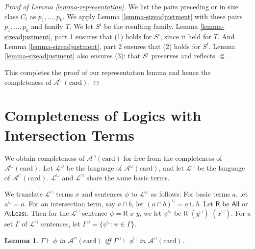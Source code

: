 \documentclass[letterpaper]{article} %
\newtheorem{lemma}[theorem]{Lemma}
\theoremstyle{definition}
\newcommand{\set}[1]{\{ #1 \}}
\newcommand{\proves}{\vdash}
\newcommand{\lang}{\mathcal{L}}
\newcommand{\Aunion}{\mathscr{A}^{\cup}}
\newcommand{\Ainter}{\mathscr{A}^{\cap}}
\newcommand{\R}[2]{\mathsf{R}\,\,#1\,\,#2}
\newcommand{\AllNoArgs}{\mathsf{All}}
\newcommand{\AtleastNoArgs}{\mathsf{AtLeast}}
\newcommand{\card}{\mathrm{card}}
\newcommand{\precsubseteq}{\Subset}
\begin{document}
\begin{proof}[Proof of Lemma \ref{lemma-representation}]
We list the pairs preceding or in size class $C_i$ as $p_1, \ldots, p_k$.  We apply Lemma \ref{lemma-sizeadjustment} with these pairs $p_1, \ldots, p_k$ and family $T$.  We let $S^i$ be the resulting family.  Lemma \ref{lemma-sizeadjustment}, part 1 ensures that (1) holds for $S^i$, since it held for $T$.  And Lemma \ref{lemma-sizeadjustment}, part 2 ensures that (2) holds for $S^i$.  Lemma \ref{lemma-sizeadjustment} also ensures (3): that $S^i$ preserves and reflects $\precsubseteq$.

This completes the proof of our representation lemma and hence the completeness of $\Aunion(\card)$.
\end{proof}



\section{Completeness of Logics with \\Intersection Terms}\label{s:completenes_intersections}

We obtain completeness of $\Ainter(\card)$ for free from the completeness of  $\Aunion(\card)$.
Let $\lang^\cup$ be the language 
of $\Aunion(\card)$, and
let $\lang^\cap$ be the language of $\Ainter(\card)$. 
$\lang^\cup$ and $\lang^\cap$ share the same basic terms.


We  translate $\lang^\cap$ terms $x$ and sentences  $\phi$ to $\lang^\cup$ as follows:
 For basic terms $a$, let $a^\cup = a$. 
For an intersection term, say $a \cap b$, let $(a \cap b)^\cup = a \cup b$.  Let 
$\mathsf{R}$  be $\AllNoArgs$ or $\AtleastNoArgs$.
Then for the $\lang^\cap$-sentence
$\psi = \R{x}{y}$, we let     $\psi^\cup$ be  
 $\R{(y^\cup)}{(x^\cup)}$.  For a set $\Gamma$ of $\lang^\cap$ sentences,
 let $\Gamma^\cup = \set{\psi^\cup : \psi\in \Gamma}$.
 


\begin{lemma}
\label{lemma-proof-translation}
$\Gamma\proves\phi$ in $\Ainter(\card)$
iff $\Gamma^\cup\proves\phi^\cup$ in $\Aunion(\card)$.
\end{lemma}
\end{document}

